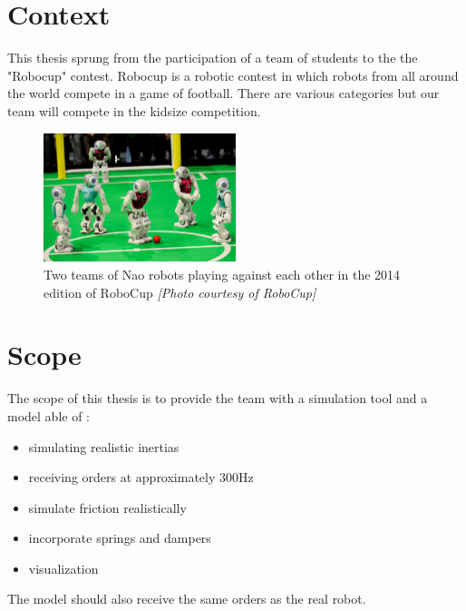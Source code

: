 \section{Context}
This thesis sprung from the participation of a team of students to the the "Robocup" contest. Robocup is a robotic contest in which robots from all around the world compete in a game of football. There are various categories but our team will compete in the kidsize competition.

\begin{figure}[htp]
\center
\includegraphics[width=0.5\textwidth]{figures/robocup}
\caption{Two teams of Nao robots playing against each other in the 2014 edition of RoboCup \textit{[Photo courtesy of RoboCup]}}
\label{fig:intro_robocup}
\end{figure}

\section{Scope}
The scope of this thesis is to provide the team with a simulation tool and a model able of :
\begin{itemize}
\item simulating realistic inertias
\item receiving orders at approximately 300Hz
\item simulate friction realistically
\item incorporate springs and dampers
\item visualization
\end{itemize}

The model should also receive the same orders as the real robot.
